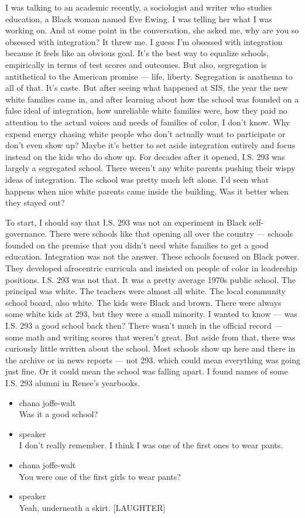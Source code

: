 I was talking to an academic recently, a sociologist and writer who
studies education, a Black woman named Eve Ewing. I was telling her what
I was working on. And at some point in the conversation, she asked me,
why are you so obsessed with integration? It threw me. I guess I'm
obsessed with integration because it feels like an obvious goal. It's
the best way to equalize schools, empirically in terms of test scores
and outcomes. But also, segregation is antithetical to the American
promise --- life, liberty. Segregation is anathema to all of that. It's
caste. But after seeing what happened at SIS, the year the new white
families came in, and after learning about how the school was founded on
a false ideal of integration, how unreliable white families were, how
they paid no attention to the actual voices and needs of families of
color, I don't know. Why expend energy chasing white people who don't
actually want to participate or don't even show up? Maybe it's better to
set aside integration entirely and focus instead on the kids who do show
up. For decades after it opened, I.S. 293 was largely a segregated
school. There weren't any white parents pushing their wispy ideas of
integration. The school was pretty much left alone. I'd seen what
happens when nice white parents came inside the building. Was it better
when they stayed out?

To start, I should say that I.S. 293 was not an experiment in Black
self-governance. There were schools like that opening all over the
country --- schools founded on the premise that you didn't need white
families to get a good education. Integration was not the answer. These
schools focused on Black power. They developed afrocentric curricula and
insisted on people of color in leadership positions. I.S. 293 was not
that. It was a pretty average 1970s public school. The principal was
white. The teachers were almost all white. The local community school
board, also white. The kids were Black and brown. There were always some
white kids at 293, but they were a small minority. I wanted to know ---
was I.S. 293 a good school back then? There wasn't much in the official
record --- some math and writing scores that weren't great. But aside
from that, there was curiously little written about the school. Most
schools show up here and there in the archive or in news reports --- not
293. which could mean everything was going just fine. Or it could mean
the school was falling apart. I found names of some I.S. 293 alumni in
Renee's yearbooks.

\begin{itemize}
\item
  chana joffe-walt\\
  Was it a good school?
\item
  speaker\\
  I don't really remember. I think I was one of the first ones to wear
  pants.
\item
  chana joffe-walt\\
  You were one of the first girls to wear pants?
\item
  speaker\\
  Yeah, underneath a skirt. {[}LAUGHTER{]}
\end{itemize}

